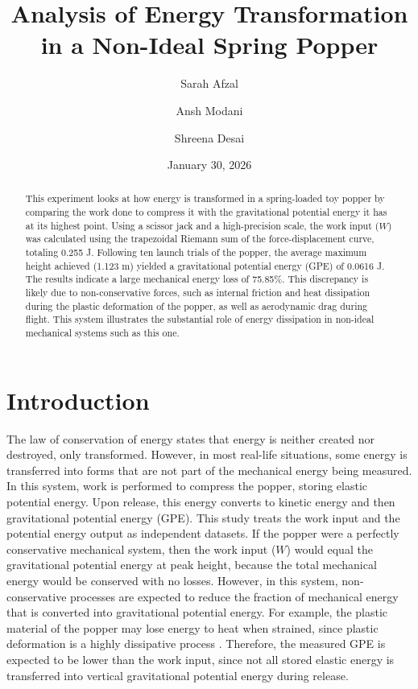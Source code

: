 \documentclass[amsmath,amssymb,aps,endfloats,linenumbers]{revtex4-2}
\begin{document}
\title{Analysis of Energy Transformation in a Non-Ideal Spring Popper}
\author{Sarah Afzal}
\author{Ansh Modani}
\author{Shreena Desai}
\date{January 30, 2026}

\begin{abstract}
This experiment looks at how energy is transformed in a spring-loaded toy popper by comparing the work done to compress it with the gravitational potential energy it has at its highest point. Using a scissor jack and a high-precision scale, the work input ($W$) was calculated using the trapezoidal Riemann sum of the force-displacement curve, totaling 0.255 J. Following ten launch trials of the popper, the average maximum height achieved (1.123 m) yielded a gravitational potential energy (GPE) of 0.0616 J. The results indicate a large mechanical energy loss of 75.85\%. This discrepancy is likely due to non-conservative forces, such as internal friction and heat dissipation during the plastic deformation of the popper, as well as aerodynamic drag during flight. This system illustrates the substantial role of energy dissipation in non-ideal mechanical systems such as this one.
\end{abstract}


\maketitle
\thispagestyle{mytitlepage}

\section{Introduction}
The law of conservation of energy states that energy is neither created nor destroyed, only transformed. However, in most real-life situations, some energy is transferred into forms that are not part of the mechanical energy being measured. In this system, work is performed to compress the popper, storing elastic potential energy. Upon release, this energy converts to kinetic energy and then gravitational potential energy (GPE). This study treats the work input and the potential energy output as independent datasets. If the popper were a perfectly conservative mechanical system, then the work input ($W$) would equal the gravitational potential energy at peak height, because the total mechanical energy would be conserved with no losses. However, in this system, non-conservative processes are expected to reduce the fraction of mechanical energy that is converted into gravitational potential energy. For example, the plastic material of the popper may lose energy to heat when strained, since plastic deformation is a highly dissipative process \cite{sendrowicz2022stored}. Therefore, the measured GPE is expected to be lower than the work input, since not all stored elastic energy is transferred into vertical gravitational potential energy during release.
\end{document}
